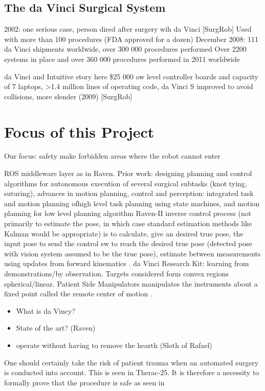 \subsection{The da Vinci Surgical System}
2002: one serious case, person dired after surgery wih da Vinci [SurgRob]
Used with more than 100 procedures (FDA approved for a dozen)
December 2008: 111 da Vinci shipments worldwide, over 300 000 procedures performed
Over 2200 systems in place and over 360 000 procedures performed in 2011 worldwide \citep{bib:raven_ii}

da Vinci and Intuitive story here
\$25 000 ow level controller boards and capacity of 7 laptops, >1.4 million lines of operating code, da Vinci S improved to avoid collisions, more slender (2009) [SurgRob]

\section{Focus of this Project}
Our focus:
safety
make forbidden areas where the robot cannot enter

ROS middleware layer as in Raven.
Prior work: designing planning and control algorithms for autonomous execution of several surgical subtasks (knot tying, suturing), advances in motion planning, control and perception: integrated task and motion planning ofhigh level task planning using state machines, and motion planning for low level planning algorithm  \citep{bib:raven_debride}
Raven-II inverse control process (not primarily to estimate the pose, in which case standard estimation methods like Kalman would be appropriate) is to calculate, give an desired true pose, the input pose to send the control sw to reach the desired true pose (detected pose with vision system assumed to be the true pose), estimate between measurements using updates from forward kinematics \citep{bib:raven_debride}.
da Vinci Research Kit: learning from demonstrations/by observation. Targets considered form convex regions spherical/linear. Patient Side Manipulators manipulates the instruments about a fixed point called the remote center of motion \citep{bib:raven_observ}.


\begin{itemize}
\item What is da Vincy?
\item State of the art? (Raven)
\item operate without having to remove the hearth (Sloth of Rafael)
\end{itemize}
One should certainly take the risk of patient trauma when an automated surgery is conducted into account. This is seen in Therac-25. It is therefore a necessity to formally prove that the procedure is safe as seen in \citep{bib:safety}